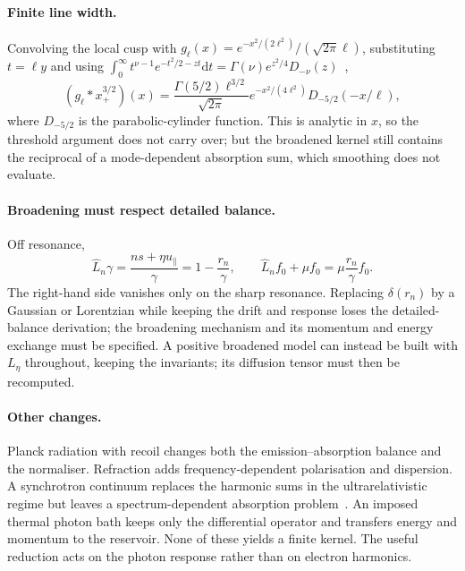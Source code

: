 \documentclass[11pt,a4paper]{article}
\numberwithin{equation}{section}
\newcommand{\dd}{\mathrm{d}}
\newcommand{\upar}{u_\parallel}
\begin{document}
\paragraph{Finite line width.} Convolving the local cusp with
$g_\ell(x)=e^{-x^2/(2\ell^2)}/(\sqrt{2\pi}\ell)$, substituting $t=\ell y$ and
using $\int_0^\infty t^{\nu-1}e^{-t^2/2-zt}\dd t=\Gamma(\nu)e^{z^2/4}D_{-\nu}(z)$~\cite{DLMF},
\begin{equation}
(g_\ell*x_+^{3/2})(x)=\frac{\Gamma(5/2)\ell^{3/2}}{\sqrt{2\pi}}e^{-x^2/(4\ell^2)}D_{-5/2}(-x/\ell),
\end{equation}
where $D_{-5/2}$ is the parabolic-cylinder function. This is analytic in $x$,
so the threshold argument does not carry over; but the broadened kernel still
contains the reciprocal of a mode-dependent absorption sum, which smoothing
does not evaluate.

\paragraph{Broadening must respect detailed balance.} Off resonance,
\begin{equation}
\hat L_n\gamma=\frac{ns+\eta\upar}{\gamma}=1-\frac{r_n}{\gamma},\qquad
\hat L_nf_0+\mu f_0=\mu\frac{r_n}{\gamma}f_0 .
\end{equation}
The right-hand side vanishes only on the sharp resonance. Replacing
$\delta(r_n)$ by a Gaussian or Lorentzian while keeping the drift and response
loses the detailed-balance derivation; the broadening mechanism and its
momentum and energy exchange must be specified. A positive broadened model can
instead be built with $L_\eta$ throughout, keeping the invariants; its
diffusion tensor must then be recomputed.

\paragraph{Other changes.} Planck radiation with recoil changes both the
emission--absorption balance and the normaliser. Refraction adds
frequency-dependent polarisation and dispersion. A synchrotron continuum
replaces the harmonic sums in the ultrarelativistic regime but leaves a
spectrum-dependent absorption problem~\cite{Ochs24a,Ochs24b}. An imposed
thermal photon bath keeps only the differential operator and transfers energy
and momentum to the reservoir. None of these yields a finite kernel. The
useful reduction acts on the photon response rather than on electron
harmonics.

\end{document}
